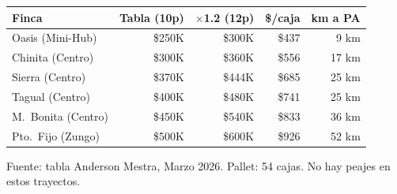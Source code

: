 \documentclass[aspectratio=169, 10pt]{beamer}
\begin{document}
\begin{frame}
\vspace{6pt}
\begin{center}
\scriptsize
\renewcommand{\arraystretch}{0.95}
\begin{tabular}{l r r r r}
    \toprule
    \textbf{Finca} & \textbf{Tabla (10p)} & \textbf{$\times$1.2 (12p)} & \textbf{\$/caja} & \textbf{km a PA} \\
    \midrule
    Oasis (Mini-Hub)      & \$250K & \$300K & \$437 & 9 km \\
    Chinita (Centro)      & \$300K & \$360K & \$556 & 17 km \\
    Sierra (Centro)       & \$370K & \$444K & \$685 & 25 km \\
    Tagual (Centro)       & \$400K & \$480K & \$741 & 25 km \\
    M.\ Bonita (Centro)   & \$450K & \$540K & \$833 & 36 km \\
    Pto.\ Fijo (Zungo)    & \$500K & \$600K & \$926 & 52 km \\
    \bottomrule
\end{tabular}
\end{center}
\vspace{-2pt}
{\tiny\color{gris} Fuente: tabla Anderson Mestra, Marzo 2026. Pallet: 54 cajas. No hay peajes en estos trayectos.}
\end{frame}
\end{document}
